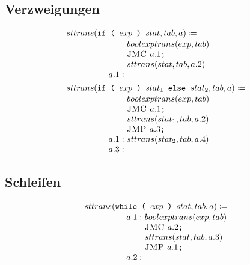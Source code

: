 \documentclass[ngerman,a4paper, 12pt, fleqn]{article}
\newcommand{\defeq}{\coloneqq}
\newcommand{\befehl}[1]{\textsc{#1}}
\begin{document}
	\subsection*{Verzweigungen}
	\begin{align*}
		&sttrans(\texttt{if ( } exp \texttt{ ) } stat, tab, a) \defeq \\[-3pt]
		& \hspace{5em}
		\begin{aligned}
			&boolexptrans(exp, tab) \\[-3pt]
			&\befehl{JMC } a.1\texttt{;} \\[-3pt]
			&sttrans(stat, tab, a.2) \\[-3pt]
			a.1: \ &
		\end{aligned} \\
		&sttrans(\texttt{if ( } exp \texttt{ ) } stat_1 \texttt{ else } stat_2, tab, a) \defeq \\[-3pt]
		&\hspace{5em}\begin{aligned}
			&boolexptrans(exp, tab) \\[-3pt]
			&\befehl{JMC } a.1\texttt{;} \\[-3pt]
			&sttrans(stat_1, tab, a.2) \\[-3pt]
			&\befehl{JMP } a.3\texttt{;} \\[-3pt]
			a.1: \ &sttrans(stat_2 , tab, a.4) \\[-3pt]
			a.3: \ &
		\end{aligned} 
	\end{align*}

 	\subsection*{Schleifen}
 	
 	\begin{align*}
 		&sttrans(\texttt{while ( } exp \texttt{ ) } stat, tab, a) \defeq \\[-3pt]
 		&\hspace{5em}\begin{aligned}
 			a.1: \ &boolexptrans(exp, tab) \\[-3pt]
 			&\befehl{JMC } a.2 \texttt{;} \\[-3pt]
 			&sttrans(stat, tab, a.3) \\[-3pt]
 			&\befehl{JMP } a.1\texttt{;} \\[-3pt]
 			a.2: \ &
 		\end{aligned}
 	\end{align*}
 
\end{document}
